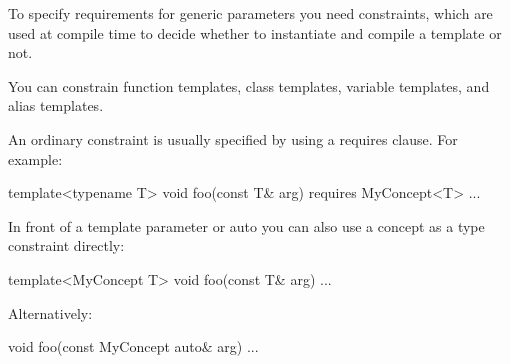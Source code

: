 To specify requirements for generic parameters you need constraints, which are used at compile time to decide whether to instantiate and compile a template or not.

You can constrain function templates, class templates, variable templates, and alias templates.

An ordinary constraint is usually specified by using a requires clause. For example:

\begin{cpp}
template<typename T>
void foo(const T& arg)
requires MyConcept<T>
...
\end{cpp}

In front of a template parameter or auto you can also use a concept as a type constraint directly:

\begin{cpp}
template<MyConcept T>
void foo(const T& arg)
...
\end{cpp}

Alternatively:

\begin{cpp}
void foo(const MyConcept auto& arg)
...
\end{cpp}












